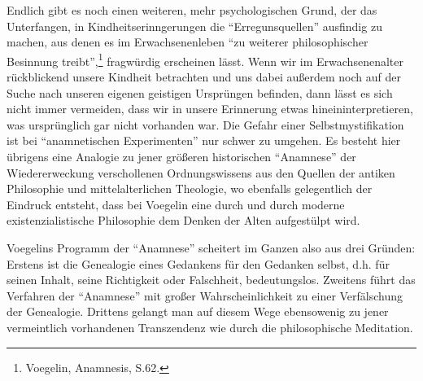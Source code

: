Endlich gibt es noch einen weiteren, mehr psychologischen Grund, der das
Unterfangen, in Kindheitserinngerungen die "`Erregunsquellen"' ausfindig zu
machen, aus denen es im Erwachsenenleben "`zu weiterer philosophischer
Besinnung treibt"',\footnote{Voegelin, Anamnesis, S.62.} fragwürdig erscheinen
lässt. Wenn wir im Erwachsenenalter rückblickend unsere Kindheit betrachten
und uns dabei außerdem noch auf der Suche nach unseren eigenen geistigen
Ursprüngen befinden, dann lässt es sich nicht immer vermeiden, dass wir in
unsere Erinnerung etwas hineininterpretieren, was ursprünglich gar nicht
vorhanden war. Die Gefahr einer Selbstmystifikation ist bei "`anamnetischen
Experimenten"' nur schwer zu umgehen. Es besteht hier übrigens eine Analogie
zu jener größeren historischen "`Anamnese"' der Wiedererweckung verschollenen
Ordnungswissens aus den Quellen der antiken Philosophie und mittelalterlichen
Theologie, wo ebenfalls gelegentlich der Eindruck entsteht, dass bei Voegelin
eine durch und durch moderne existenzialistische Philosophie dem Denken der
Alten aufgestülpt wird.

Voegelins Programm der "`Anamnese"' scheitert im Ganzen also aus drei Gründen:
Erstens ist die Genealogie eines Gedankens für den Gedanken selbst, d.h. für
seinen Inhalt, seine Richtigkeit oder Falschheit, bedeutungslos.
Zweitens führt das Verfahren der "`Anamnese"' mit großer Wahrscheinlichkeit zu
einer Verfälschung der Genealogie. Drittens gelangt man auf diesem Wege
ebensowenig zu jener vermeintlich vorhandenen Transzendenz wie durch die
philosophische Meditation.














